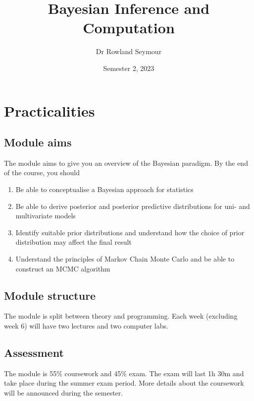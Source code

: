 \documentclass[
]{book}
\title{Bayesian Inference and Computation}
\author{Dr Rowland Seymour}
\date{Semester 2, 2023}
\theoremstyle{definition}
\theoremstyle{definition}
\theoremstyle{definition}
\theoremstyle{definition}
\theoremstyle{remark}
\begin{document}
\maketitle

{
\setcounter{tocdepth}{1}
\tableofcontents
}
\hypertarget{practicalities}{%
\chapter*{Practicalities}\label{practicalities}}

\hypertarget{module-aims}{%
\section{Module aims}\label{module-aims}}

The module aims to give you an overview of the Bayesian paradigm. By the end of the course, you should

\begin{enumerate}
\def\labelenumi{\arabic{enumi}.}
\item
  Be able to conceptualise a Bayesian approach for statistics
\item
  Be able to derive posterior and posterior predictive distributions for uni- and multivariate models
\item
  Identify suitable prior distributions and understand how the choice of prior distribution may affect the final result
\item
  Understand the principles of Markov Chain Monte Carlo and be able to construct an MCMC algorithm
\end{enumerate}

\hypertarget{module-structure}{%
\section{Module structure}\label{module-structure}}

The module is split between theory and programming. Each week (excluding week 6) will have two lectures and two computer labs.

\hypertarget{assessment}{%
\section{Assessment}\label{assessment}}

The module is 55\% coursework and 45\% exam. The exam will last 1h 30m and take place during the summer exam period. More details about the coursework will be announced during the semester.
\end{document}
